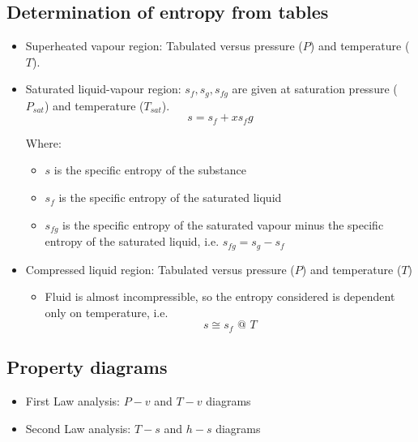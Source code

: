 \documentclass[11pt]{article}
\begin{document}
\subsection{Determination of entropy from tables}
\label{sec:org45ef004}
\begin{itemize}
\item Superheated vapour region: Tabulated versus pressure (\(P\)) and temperature (\(T\)).
\item Saturated liquid-vapour region: \(s_f, s_g, s_{fg}\) are given at saturation pressure (\(P_{sat}\)) and temperature (\(T_{sat}\)).
\[s = s_f + xs_fg\]

Where:
\begin{itemize}
\item \(s\) is the specific entropy of the substance
\item \(s_f\) is the specific entropy of the saturated liquid
\item \(s_{fg}\) is the specific entropy of the saturated vapour minus the specific entropy of the saturated liquid, i.e. \(s_{fg} = s_g - s_f\)
\end{itemize}
\item Compressed liquid region: Tabulated versus pressure (\(P\)) and temperature (\(T\))
\begin{itemize}
\item Fluid is almost incompressible, so the entropy considered is dependent only on temperature, i.e.
\[s \cong s_f \text{ @ } T\]
\end{itemize}
\end{itemize}

\subsection{Property diagrams}
\label{sec:org39da98d}
\begin{itemize}
\item First Law analysis: \(P-v\) and \(T-v\) diagrams
\item Second Law analysis: \(T-s\) and \(h-s\) diagrams
\end{itemize}
\end{document}
